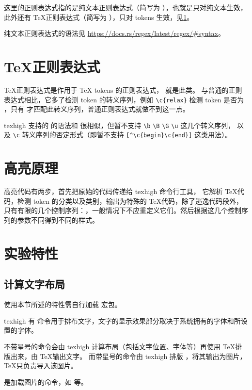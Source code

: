 \documentclass[class=article,openany]{cusdoc}
\begin{document}
这里的正则表达式指的是纯文本正则表达式（简写为 ），也就是只对纯文本生效，此外还有 \TeX 正则表达式（简写为 ），只对 tokens 生效，见\cref{sec:regtex}。

纯文本正则表达式的语法见 \url{https://docs.rs/regex/latest/regex/#syntax}。


\section{\TeX 正则表达式}\label{sec:regtex}

\TeX 正则表达式是作用于 {\TeX} tokens 的正则表达式， 就是此类。
与普通的正则表达式相比，它多了检测 token 的转义序列，例如 \verb|\c{relax}| 检测 token
是否为 ，只有  才匹配此转义序列，普通正则表达式就做不到这一点。

texhigh 支持的  的语法和  很相似，但暂不支持
\verb|\b| \verb|\B| \verb|\G| \verb|\u| 这几个转义序列，
以及 \verb|\c| 转义序列的否定形式（即暂不支持 \verb|[^\c{begin}\c{end}]| 这类用法）。


\section{高亮原理}

 高亮代码有两步，首先把原始的代码传递给 texhigh 命令行工具，
它解析 \TeX 代码，检测 token 的分类以及类别，输出为特殊的 \TeX 代码，除了逃逸代码段外，
只有有限的几个控制序列：{\makeatletter{}}，一般情况下不应重定义它们。然后根据这几个控制序列的参数不同得到不同的样式。


\section{实验特性}

\subsection{计算文字布局}

使用本节所述的特性需自行加载  宏包。

texhigh 有  命令用于排布文字，文字的显示效果部分取决于系统拥有的字体和所设置的字体。
\begin{function}{\kaomoji}
  \begin{syntax}
    \V\kaomoji   {} 
    \V\kaomoji *   
  \end{syntax}
不带星号的命令会由 texhigh 计算布局（包括文字位置、字体等）再使用 \TeX 排版出来，由 \TeX 输出文字。
而带星号的命令由 texhigh 排版 ，将其输出为图片，\TeX 只负责导入该图片。

 是加载图片的命令，如  等。
\end{function}
\end{document}
